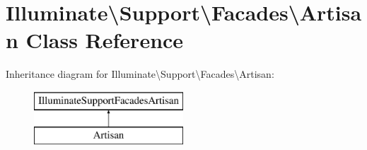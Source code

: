 \hypertarget{class_illuminate_1_1_support_1_1_facades_1_1_artisan}{}\section{Illuminate\textbackslash{}Support\textbackslash{}Facades\textbackslash{}Artisan Class Reference}
\label{class_illuminate_1_1_support_1_1_facades_1_1_artisan}
Inheritance diagram for Illuminate\textbackslash{}Support\textbackslash{}Facades\textbackslash{}Artisan\+:\begin{figure}[H]
\begin{center}
\leavevmode
\includegraphics[height=2.000000cm]{class_illuminate_1_1_support_1_1_facades_1_1_artisan}
\end{center}
\end{figure}

